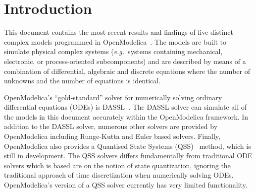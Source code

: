 \documentclass[10pt]{article}
\begin{document}
\newcommand{\bottomline}{\arrayrulecolor{white}\specialrule{\aboverulesep}{0pt}{0pt}%
	\arrayrulecolor{black}\specialrule{\heavyrulewidth}{0pt}{\belowbottomsep}}%

\newcommand{\bottomlinec}{\arrayrulecolor{tablerowcolor}\specialrule{\aboverulesep}{0pt}{0pt}%
	\arrayrulecolor{black}\specialrule{\heavyrulewidth}{0pt}{\belowbottomsep}}%

\newcommand{\bottomlinect}{\arrayrulecolor{tableheadcolor}\specialrule{\aboverulesep}{0pt}{0pt}%
	\arrayrulecolor{black}\specialrule{\heavyrulewidth}{0pt}{\belowbottomsep}}%



\maketitle



\pagestyle{myheadings}


\section{Introduction}

This document contains the most recent results and findings of five distinct complex models programmed in OpenModelica~\cite{OpenModelica}. The models are built to simulate physical complex systems ({\em e.g.}\ systems containing mechanical, electronic, or process-oriented subcomponents) and are described by means of a combination of differential, algebraic and discrete equations where the number of unknowns and the number of equations is identical.

OpenModelica's ``gold-standard'' solver for numerically solving ordinary differential equations (ODEs) is DASSL~\cite{DASSL}. The DASSL solver can simulate all of the models in this document accurately within the OpenModelica framework. In addition to the DASSL solver, numerous other solvers are provided by OpenModelica including Runge-Kutta and Euler based solvers. Finally, OpenModelica also provides a Quantised State Systems (QSS)~\cite{MigoniKofman2009} method, which is still in development. The QSS solvers differs fundamentally from traditional ODE solvers which is based are on the notion of state quantization, ignoring the traditional approach of time discretization when numerically solving ODEs. OpenModelica's version of a QSS solver currently has very limited functionality.
\end{document}
